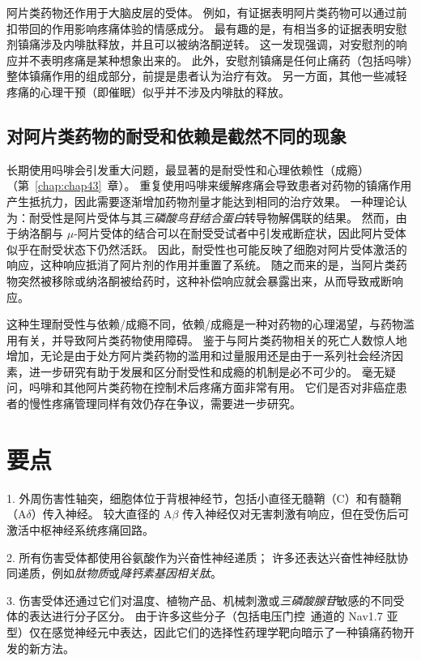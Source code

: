 阿片类药物还作用于大脑皮层的受体。
例如，有证据表明阿片类药物可以通过前扣带回的作用影响疼痛体验的情感成分。
最有趣的是，有相当多的证据表明安慰剂镇痛涉及内啡肽释放，并且可以被纳洛酮逆转。
这一发现强调，对安慰剂的响应并不表明疼痛是某种想象出来的。
此外，安慰剂镇痛是任何止痛药（包括吗啡）整体镇痛作用的组成部分，前提是患者认为治疗有效。
另一方面，其他一些减轻疼痛的心理干预（即催眠）似乎并不涉及内啡肽的释放。



\subsection{对阿片类药物的耐受和依赖是截然不同的现象}

长期使用吗啡会引发重大问题，最显著的是耐受性和心理依赖性（成瘾）（第~\ref{chap:chap43}~章）。
重复使用吗啡来缓解疼痛会导致患者对药物的镇痛作用产生抵抗力，因此需要逐渐增加药物剂量才能达到相同的治疗效果。
一种理论认为：耐受性是阿片受体与其\textit{三磷酸鸟苷结合蛋白}转导物解偶联的结果。
然而，由于纳洛酮与 $\mu$-阿片受体的结合可以在耐受受试者中引发戒断症状，因此阿片受体似乎在耐受状态下仍然活跃。
因此，耐受性也可能反映了细胞对阿片受体激活的响应，这种响应抵消了阿片剂的作用并重置了系统。
随之而来的是，当阿片类药物突然被移除或纳洛酮被给药时，这种补偿响应就会暴露出来，从而导致戒断响应。


这种生理耐受性与依赖/成瘾不同，依赖/成瘾是一种对药物的心理渴望，与药物滥用有关，并导致阿片类药物使用障碍。
鉴于与阿片类药物相关的死亡人数惊人地增加，无论是由于处方阿片类药物的滥用和过量服用还是由于一系列社会经济因素，进一步研究有助于发展和区分耐受性和成瘾的机制是必不可少的。
毫无疑问，吗啡和其他阿片类药物在控制术后疼痛方面非常有用。
它们是否对非癌症患者的慢性疼痛管理同样有效仍存在争议，需要进一步研究。



\section{要点}

1. 外周伤害性轴突，细胞体位于背根神经节，包括小直径无髓鞘（C）和有髓鞘（A$\delta$）传入神经。
较大直径的 A$\beta$ 传入神经仅对无害刺激有响应，但在受伤后可激活中枢神经系统疼痛回路。 


2. 所有伤害受体都使用谷氨酸作为兴奋性神经递质； 许多还表达兴奋性神经肽协同递质，例如\textit{肽物质}或\textit{降钙素基因相关肽}。


3. 伤害受体还通过它们对温度、植物产品、机械刺激或\textit{三磷酸腺苷}敏感的不同受体的表达进行分子区分。
由于许多这些分子（包括电压门控~通道的 Nav1.7 亚型）仅在感觉神经元中表达，因此它们的选择性药理学靶向暗示了一种镇痛药物开发的新方法。


